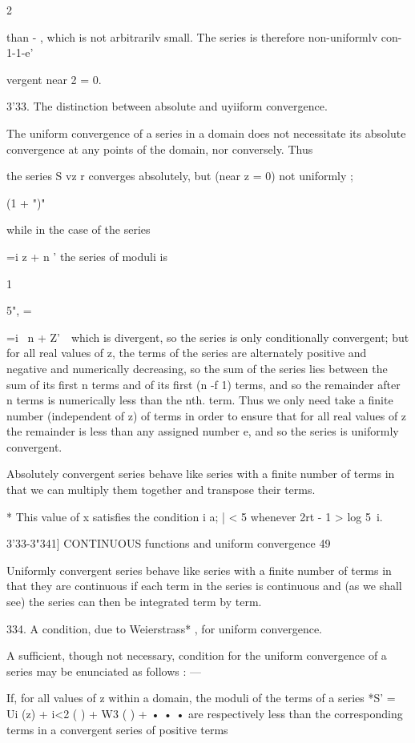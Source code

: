 2

than - , which is not arbitrarilv small. The series is therefore
non-uniformlv con- 1-1-e'

vergent near 2 = 0.

3'33. The distinction between absolute and uyiiform convergence.

The uniform convergence of a series in a domain does not necessitate
its absolute convergence at any points of the domain, nor conversely.
Thus

the series S vz r converges absolutely, but (near z = 0) not uniformly
;

(1 + ")"

while in the case of the series

 =i z + n ' the series of moduli is

1

5", =



 =i \ n + Z'\ \ which is divergent, so the series is only
conditionally convergent; but for all real values of z, the terms of
the series are alternately positive and negative and numerically
decreasing, so the sum of the series lies between the sum of its first
n terms and of its first (n -f 1) terms, and so the remainder after n
terms is numerically less than the nth. term. Thus we only need take a
finite number (independent of z) of terms in order to ensure that for
all real values of z the remainder is less than any assigned number e,
and so the series is uniformly convergent.

Absolutely convergent series behave like series with a finite number
of terms in that we can multiply them together and transpose their
terms.

* This value of x satisfies the condition i a; | < 5 whenever 2rt - 1
> log 5~i.



3'33-3"341] CONTINUOUS functions and uniform convergence 49

Uniformly convergent series behave like series with a finite number of
terms in that they are continuous if each term in the series is
continuous and (as we shall see) the series can then be integrated
term by term.

334. A condition, due to Weierstrass* , for uniform convergence.

A sufficient, though not necessary, condition for the uniform
convergence of a series may be enunciated as follows : —

If, for all values of z within a domain, the moduli of the terms of a
series *S' = Ui (z) + i<2 ( ) + W3 ( ) + • • • are respectively less
than the corresponding terms in a convergent series of positive terms

